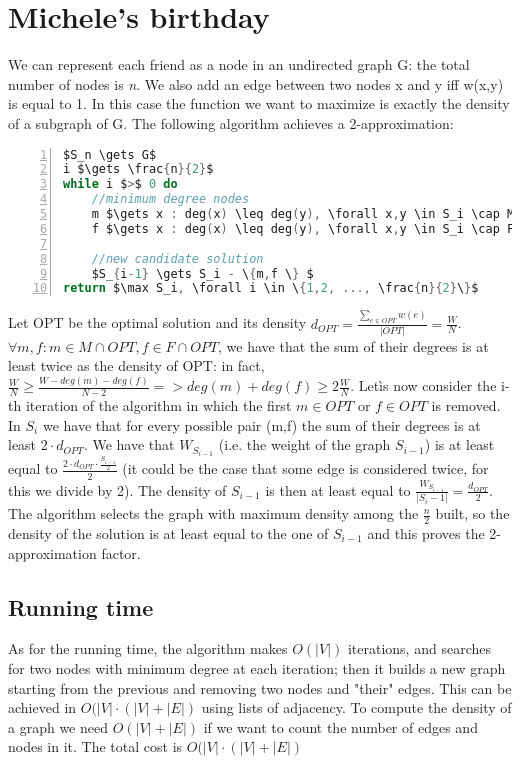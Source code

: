 \section{Michele's birthday}
We can represent each friend as a node in an undirected graph G: the total number of nodes is \textit{n}. We also add an edge between two nodes x and y iff w(x,y) is equal to 1.
In this case the function we want to maximize is exactly the density \cite{Dense subgraph} of a subgraph of G. The following algorithm achieves a 2-approximation: \begin{lstlisting}[language=C,mathescape=true, frame=single, numbers=left]
$S_n \gets G$
i $\gets \frac{n}{2}$
while i $>$ 0 do
	//minimum degree nodes
	m $\gets x : deg(x) \leq deg(y), \forall x,y \in S_i \cap M$
	f $\gets x : deg(x) \leq deg(y), \forall x,y \in S_i \cap F$
	
	//new candidate solution
	$S_{i-1} \gets S_i - \{m,f \} $
return $\max S_i, \forall i \in \{1,2, ..., \frac{n}{2}\}$ 
\end{lstlisting}
Let OPT be the optimal solution and its density $d_{OPT} = \frac{\sum_{e \in OPT} w(e)}{|OPT|} = \frac{W}{N}$.
$\forall m,f: m \in M \cap OPT, f \in F \cap OPT$, we have that the sum of their degrees is at least twice as the density of OPT: in fact, $\frac{W}{N} \geq \frac{W - deg(m) - deg(f)}{N -2} => deg(m) + deg(f) \geq 2 \frac{W}{N}$.
Letìs now consider the i-th iteration of the algorithm in which the first $m \in OPT$ or $f \in OPT$ is removed. In $S_i$ we have that for every possible pair (m,f) the sum of their degrees is at least $2 \cdot d_{OPT}$.
We have that $W_{S_{i-1}}$ (i.e. the weight of the graph $S_{i-1}$) is at least equal to $\frac{2\cdot d_{OPT}\cdot \frac{S_{i-1}}{2}}{2}$ (it could be the case that some edge is considered twice, for this we divide by 2). The density of $S_{i-1}$ is then at least equal to $\frac{W_{S_{i-1}} } {|S_i-1|} = \frac{d_{OPT}}{2}$. The algorithm selects the graph with maximum density among the $\frac{n}{2}$ built, so the density of the solution is at least equal to the one of $S_{i-1}$ and this proves the 2-approximation factor.

\subsection*{Running time}
As for the running time, the algorithm makes $O(|V|)$ iterations, and searches for two nodes with minimum degree at each iteration; then it builds a new graph starting from the previous and removing two nodes and "their" edges. This can be achieved in $O(|V|\cdot (|V|+|E|)$ using lists of adjacency. To compute the density of a graph we need $O(|V|+|E|)$ if we want to count the number of edges and nodes in it. The total cost is $O(|V|\cdot (|V|+|E|)$